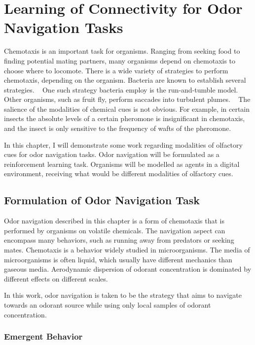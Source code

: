 \documentclass[../dissertation.tex]{subfiles}
\begin{document}
\myChapterCover{}

\section{Learning of Connectivity for Odor Navigation Tasks}
\label{sec:odor_navigation}

Chemotaxis is an important task for organisms.
Ranging from seeking food to finding potential mating partners, many organisms depend on chemotaxis to choose where to locomote.
There is a wide variety of strategies to perform chemotaxis, depending on the organism.
Bacteria are known to establish several strategies.
~\cite{bacteria}
One such strategy bacteria employ is the run-and-tumble model.
~\cite{runandtumble}
Other organisms, such as fruit fly, perform saccades into turbulent plumes.
~\cite{flynav}
The salience of the modalities of chemical cues is not obvious.
For example, in certain insects the absolute levels of a certain pheromone is insignificant in chemotaxis, and the insect is only sensitive to the frequency of wafts of the pheromone.
~\cite{murlisOdorPlumesHow1992}

In this chapter, I will demonstrate some work regarding modalities of olfactory cues for odor navigation tasks.
Odor navigation will be formulated as a reinforcement learning task.
Organisms will be modelled as agents in a digital environment, receiving what would be different modalities of olfactory cues.

\subsection{Formulation of Odor Navigation Task}

Odor navigation described in this chapter is a form of chemotaxis that is performed by organisms on volatile chemicals.
The navigation aspect can encompass many behaviors, such as running away from predators or seeking mates.
Chemotaxis is a behavior widely studied in microorganisms.
The media of microorganisms is often liquid, which usually have different mechanics than gaseous media.
Aerodynamic dispersion of odorant concentration is dominated by different effects on different scales.

In this work, odor navigation is taken to be the strategy that aims to navigate towards an odorant source while using only local samples of odorant concentration.

\subsubsection{Emergent Behavior}
\end{document}
